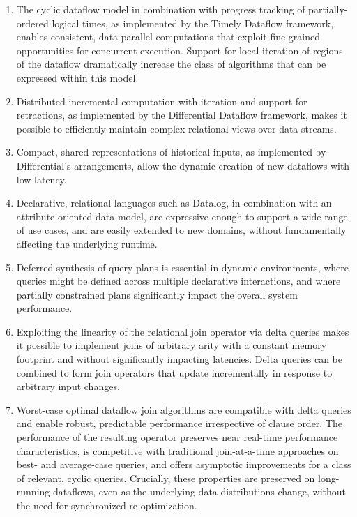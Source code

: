\documentclass{article}
\begin{document}
\begin{enumerate}
\item
  The cyclic dataflow model in combination with progress tracking of
  partially-ordered logical times, as implemented by the Timely
  Dataflow framework, enables consistent, data-parallel computations
  that exploit fine-grained opportunities for concurrent
  execution. Support for local iteration of regions of the dataflow
  dramatically increase the class of algorithms that can be expressed
  within this model.

\item
  Distributed incremental computation with iteration and support for
  retractions, as implemented by the Differential Dataflow framework,
  makes it possible to efficiently maintain complex relational views
  over data streams.

\item
  Compact, shared representations of historical inputs, as implemented
  by Differential's arrangements, allow the dynamic creation of new
  dataflows with low-latency.

\item
  Declarative, relational languages such as Datalog, in combination
  with an attribute-oriented data model, are expressive enough to
  support a wide range of use cases, and are easily extended to new
  domains, without fundamentally affecting the underlying runtime.

\item
  Deferred synthesis of query plans is essential in dynamic
  environments, where queries might be defined across multiple
  declarative interactions, and where partially constrained plans
  significantly impact the overall system performance.

\item
  Exploiting the linearity of the relational join operator via delta
  queries makes it possible to implement joins of arbitrary arity with
  a constant memory footprint and without significantly impacting
  latencies. Delta queries can be combined to form join operators that
  update incrementally in response to arbitrary input changes.

\item
  Worst-case optimal dataflow join algorithms are compatible with
  delta queries and enable robust, predictable performance
  irrespective of clause order. The performance of the resulting
  operator preserves near real-time performance characteristics, is
  competitive with traditional join-at-a-time approaches on best- and
  average-case queries, and offers asymptotic improvements for a class
  of relevant, cyclic queries. Crucially, these properties are
  preserved on long-running dataflows, even as the underlying data
  distributions change, without the need for synchronized
  re-optimization.


\end{enumerate}
\end{document}
